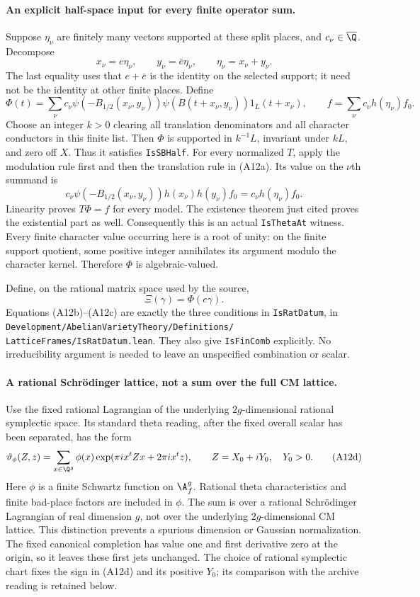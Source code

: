 \paragraph{An explicit half-space input for every finite operator sum.}
Suppose $\eta_\nu$ are finitely many vectors supported at these
split places, and $c_\nu\in\overline\Q$.  Decompose
\[
 x_\nu=e\eta_\nu,\qquad y_\nu=\bar e\eta_\nu,
 \qquad \eta_\nu=x_\nu+y_\nu.
\]
The last equality uses that $e+\bar e$ is the identity on
the selected support; it need not be the identity at other
finite places.  Define
\[
 \Phi(t)=\sum_\nu c_\nu\psi(-B_{1/2}(x_\nu,y_\nu))
       \psi(B(t+x_\nu,y_\nu))1_L(t+x_\nu),
 \qquad
 f=\sum_\nu c_\nu h(\eta_\nu)f_0.
 \tag{A12b}
\]
Choose an integer $k>0$ clearing all translation denominators
and all character conductors in this finite list.  Then
$\Phi$ is supported in $k^{-1}L$, invariant under $kL$, and
zero off $X$.  Thus it satisfies \texttt{IsSBHalf}.  For
every normalized $T$, apply the modulation rule first and
then the translation rule in (A12a).  Its value on the
$\nu$th summand is
\[
 c_\nu\psi(-B_{1/2}(x_\nu,y_\nu))h(x_\nu)h(y_\nu)f_0
                         =c_\nu h(\eta_\nu)f_0.
\]
Linearity proves $T\Phi=f$ for every model.  The existence
theorem just cited proves the existential part as well.
Consequently this is an actual \texttt{IsThetaAt} witness.
Every finite character value occurring here is a root of
unity: on the finite support quotient, some positive integer
annihilates its argument modulo the character kernel.
Therefore $\Phi$ is algebraic-valued.

Define, on the rational matrix space used by the source,
\[
                         \Xi(\gamma)=\Phi(e\gamma).
 \tag{A12c}
\]
Equations (A12b)--(A12c) are exactly the three conditions in
\texttt{IsRatDatum}, in
\texttt{Development/AbelianVarietyTheory/Definitions/}
\texttt{LatticeFrames/IsRatDatum.lean}.  They also give
\texttt{IsFinComb} explicitly.  No irreducibility argument
is needed to leave an unspecified combination or scalar.

\paragraph{A rational Schr\"odinger lattice, not a sum over the full CM lattice.}
Use the fixed rational Lagrangian of the underlying
$2g$-dimensional rational symplectic space.  Its standard
theta reading, after the fixed overall scalar has been
separated, has the form
\[
 \vartheta_\phi(Z,z)=
   \sum_{x\in\Q^g}\phi(x)
          \exp(\pi i x^tZx+2\pi i x^tz),
 \qquad Z=X_0+iY_0,\quad Y_0>0.
 \tag{A12d}
\]
Here $\phi$ is a finite Schwartz function on $\A_f^g$.
Rational theta characteristics and finite bad-place factors
are included in $\phi$.  The sum is over a rational
Schr\"odinger Lagrangian of real dimension $g$, not over
the underlying $2g$-dimensional CM lattice.  This distinction
prevents a spurious dimension or Gaussian normalization.
The fixed canonical completion has value one and first
derivative zero at the origin, so it leaves these first
jets unchanged.  The choice of rational symplectic chart
fixes the sign in (A12d) and its positive $Y_0$; its
comparison with the archive reading is retained below.

